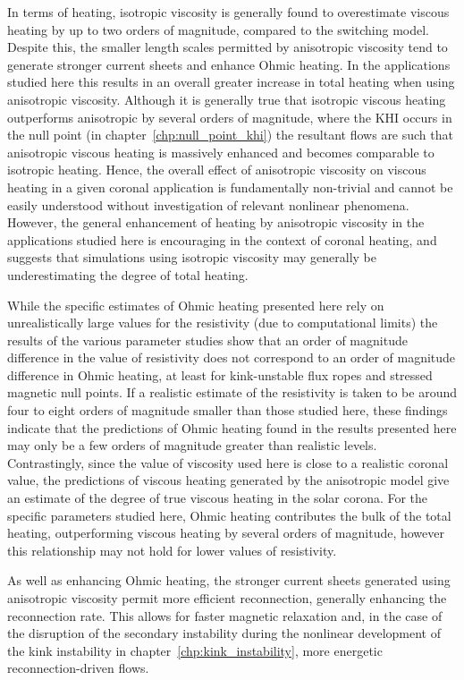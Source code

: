In terms of heating, isotropic viscosity is generally found to overestimate viscous heating by up to two orders of magnitude, compared to the switching model. Despite this, the smaller length scales permitted by anisotropic viscosity tend to generate stronger current sheets and enhance Ohmic heating. In the applications studied here this results in an overall greater increase in total heating when using anisotropic viscosity. Although it is generally true that isotropic viscous heating outperforms anisotropic by several orders of magnitude, where the KHI occurs in the null point (in chapter~\ref{chp:null_point_khi}) the resultant flows are such that anisotropic viscous heating is massively enhanced and becomes comparable to isotropic heating. Hence, the overall effect of anisotropic viscosity on viscous heating in a given coronal application is fundamentally non-trivial and cannot be easily understood without investigation of relevant nonlinear phenomena. However, the general enhancement of heating by anisotropic viscosity in the applications studied here is encouraging in the context of coronal heating, and suggests that simulations using isotropic viscosity may generally be underestimating the degree of total heating.

While the specific estimates of Ohmic heating presented here rely on unrealistically large values for the resistivity (due to computational limits) the results of the various parameter studies show that an order of magnitude difference in the value of resistivity does not correspond to an order of magnitude difference in Ohmic heating, at least for kink-unstable flux ropes and stressed magnetic null points. If a realistic estimate of the resistivity is taken to be around four to eight orders of magnitude smaller than those studied here, these findings indicate that the predictions of Ohmic heating found in the results presented here may only be a few orders of magnitude greater than realistic levels. Contrastingly, since the value of viscosity used here is close to a realistic coronal value, the predictions of viscous heating generated by the anisotropic model give an estimate of the degree of true viscous heating in the solar corona. For the specific parameters studied here, Ohmic heating contributes the bulk of the total heating, outperforming viscous heating by several orders of magnitude, however this relationship may not hold for lower values of resistivity. 

As well as enhancing Ohmic heating, the stronger current sheets generated using anisotropic viscosity permit more efficient reconnection, generally enhancing the reconnection rate. This allows for faster magnetic relaxation and, in the case of the disruption of the secondary instability during the nonlinear development of the kink instability in chapter~\ref{chp:kink_instability}, more energetic reconnection-driven flows.

